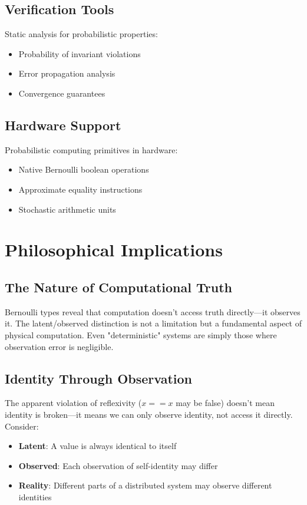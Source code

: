 \documentclass[11pt,final,hidelinks]{article}
\begin{document}
\subsection{Verification Tools}

Static analysis for probabilistic properties:
\begin{itemize}
    \item Probability of invariant violations
    \item Error propagation analysis
    \item Convergence guarantees
\end{itemize}

\subsection{Hardware Support}

Probabilistic computing primitives in hardware:
\begin{itemize}
    \item Native Bernoulli boolean operations
    \item Approximate equality instructions
    \item Stochastic arithmetic units
\end{itemize}

\section{Philosophical Implications}

\subsection{The Nature of Computational Truth}

Bernoulli types reveal that computation doesn't access truth directly—it observes it. The latent/observed distinction is not a limitation but a fundamental aspect of physical computation. Even "deterministic" systems are simply those where observation error is negligible.

\subsection{Identity Through Observation}

The apparent violation of reflexivity ($x == x$ may be false) doesn't mean identity is broken—it means we can only observe identity, not access it directly. Consider:
\begin{itemize}
    \item \textbf{Latent}: A value is always identical to itself
    \item \textbf{Observed}: Each observation of self-identity may differ
    \item \textbf{Reality}: Different parts of a distributed system may observe different identities
\end{itemize}
\end{document}
